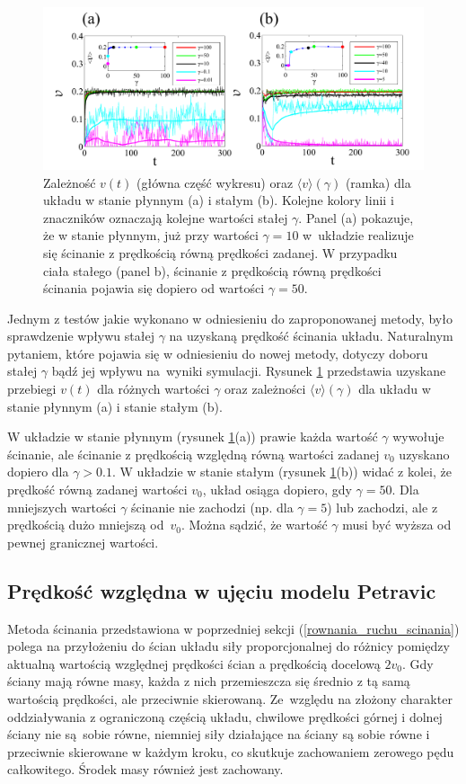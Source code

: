 \documentclass[12pt,a4paper,openright]{report} %
\begin{document}
\begin{figure}[h]
\centering
\includegraphics[width=160mm]{rysunki/v_od_gamma.pdf}
\caption{Zależność $v(t)$ (główna część wykresu) oraz $\langle v \rangle(\gamma)$ (ramka) dla układu w stanie płynnym (a) i stałym (b). Kolejne kolory linii i znaczników oznaczają kolejne wartości stałej $\gamma$. Panel (a) pokazuje, że w stanie płynnym, już przy wartości $\gamma=10$ w~układzie realizuje się ścinanie z prędkością równą prędkości zadanej. W przypadku ciała stałego (panel b), ścinanie z prędkością równą prędkości ścinania pojawia się dopiero od wartości $\gamma=50$.}
\label{v_od_gamma}
\end{figure}
Jednym z testów jakie wykonano w odniesieniu do zaproponowanej metody, było sprawdzenie wpływu stałej $\gamma$ na uzyskaną prędkość ścinania układu. Naturalnym pytaniem, które pojawia się w odniesieniu do nowej metody, dotyczy doboru stałej $\gamma$ bądź jej wpływu na~wyniki symulacji. Rysunek \ref{v_od_gamma} przedstawia uzyskane przebiegi $v(t)$ dla różnych wartości $\gamma$ oraz zależności $\langle v \rangle(\gamma)$ dla układu w stanie płynnym (a) i stanie stałym (b).

%
W układzie w stanie płynnym (rysunek \ref{v_od_gamma}(a)) prawie każda wartość $\gamma$ wywołuje ścinanie, ale ścinanie z prędkością względną równą wartości zadanej $ v_0$ uzyskano dopiero dla $\gamma>0.1$. W układzie w stanie stałym (rysunek \ref{v_od_gamma}(b)) widać z kolei, że prędkość równą zadanej wartości $v_0$, układ osiąga dopiero, gdy $\gamma=50$. Dla mniejszych wartości $\gamma$ ścinanie nie zachodzi (np. dla $\gamma=5$) lub zachodzi, ale z prędkością dużo mniejszą od~$v_0$. Można sądzić, że wartość $\gamma$ musi być wyższa od pewnej granicznej wartości.
%
\subsection{Prędkość względna w ujęciu modelu Petravic}
%
Metoda ścinania przedstawiona w poprzedniej sekcji (\ref{rownania_ruchu_scinania}) polega na przyłożeniu do ścian układu siły proporcjonalnej do różnicy pomiędzy aktualną wartością względnej prędkości ścian a prędkością docelową $2v_0$. Gdy ściany mają równe masy, każda z nich przemieszcza się średnio z tą samą wartością prędkości, ale przeciwnie skierowaną. Ze~względu na złożony charakter oddziaływania z ograniczoną częścią układu, chwilowe prędkości górnej i dolnej ściany nie są~sobie równe, niemniej siły działające na ściany są sobie równe i przeciwnie skierowane w każdym kroku, co skutkuje zachowaniem zerowego pędu całkowitego. Środek masy również jest zachowany.
\end{document}
